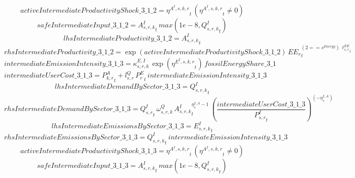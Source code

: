 \begin{dmath*}
activeIntermediateProductivityShock\_3\_1\_2 = {{\eta^{A^{I},s,k,r}}}_{t}\, \left({{\eta^{A^{I},s,k,r}}}_{t}\neq 0\right)
\end{dmath*}
\begin{dmath*}
safeIntermediateInput\_3\_1\_2 = {{A^{I}_{s,r,k}}}_{t}\, max(1e-8,{{Q^{I}_{s,r,k}}}_{t})
\end{dmath*}
\begin{dmath*}
lhsIntermediateProductivity\_3\_1\_2 = {{A^{I}_{s,r,k}}}_{t}
\end{dmath*}
\begin{dmath*}
rhsIntermediateProductivity\_3\_1\_2 = \exp\left({activeIntermediateProductivityShock\_3\_1\_2}\right)\, {{EE_r}}_{t}^{\left(2=={{s^{Energy}}}\right)\, {{\ell^{EE}_{s,r}}}_{t}}
\end{dmath*}
\begin{dmath*}
intermediateEmissionIntensity\_3\_1\_3 = {{\kappa^{E,I}_{s,r,k}}}\, \exp\left({{\eta^{E^{I},s,k,r}}}_{t}\right)\, {fossilEnergyShare\_3\_1}
\end{dmath*}
\begin{dmath*}
intermediateUserCost\_3\_1\_3 = {{P^{A}_{k,r}}}_{t}+{{l^{Q}_{s,r}}}\, {{P^E_r}}_{t}\, {intermediateEmissionIntensity\_3\_1\_3}
\end{dmath*}
\begin{dmath*}
lhsIntermediateDemandBySector\_3\_1\_3 = {{Q^{I}_{s,r,k}}}_{t}
\end{dmath*}
\begin{dmath*}
rhsIntermediateDemandBySector\_3\_1\_3 = {{Q^{I}_{s,r}}}_{t}\, {{\omega^{Q}_{s,r,k}}}\, {{A^{I}_{s,r,k}}}_{t}^{{{\eta^{I,A}_{s}}}-1}\, \left(\frac{{intermediateUserCost\_3\_1\_3}}{{{P^{I}_{s,r}}}_{t}}\right)^{\left(-{{\eta^{I,A}_{s}}}\right)}
\end{dmath*}
\begin{dmath*}
lhsIntermediateEmissionsBySector\_3\_1\_3 = {{E^I_{s,r,k}}}_{t}
\end{dmath*}
\begin{dmath*}
rhsIntermediateEmissionsBySector\_3\_1\_3 = {{Q^{I}_{s,r,k}}}_{t}\, {intermediateEmissionIntensity\_3\_1\_3}
\end{dmath*}
\begin{dmath*}
activeIntermediateProductivityShock\_3\_1\_3 = {{\eta^{A^{I},s,k,r}}}_{t}\, \left({{\eta^{A^{I},s,k,r}}}_{t}\neq 0\right)
\end{dmath*}
\begin{dmath*}
safeIntermediateInput\_3\_1\_3 = {{A^{I}_{s,r,k}}}_{t}\, max(1e-8,{{Q^{I}_{s,r,k}}}_{t})
\end{dmath*}
